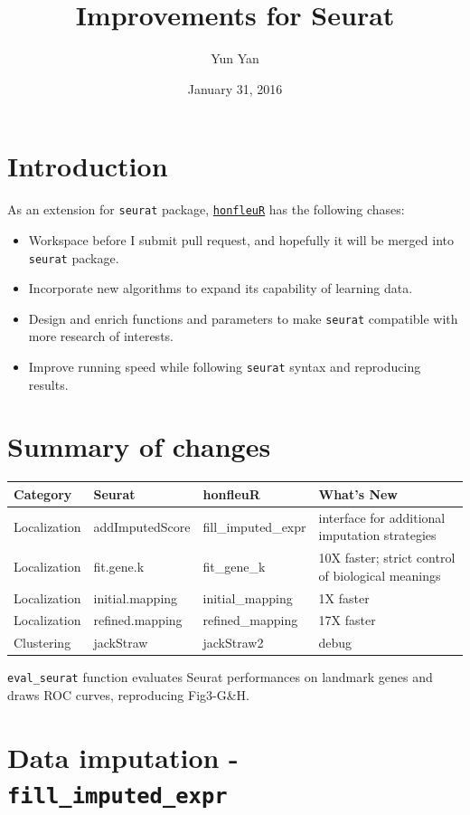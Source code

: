 \documentclass[]{article}
\title{Improvements for Seurat}
\author{Yun Yan}
\date{January 31, 2016}
\providecommand{\tightlist}{%
  \setlength{\itemsep}{0pt}\setlength{\parskip}{0pt}}
\begin{document}
\maketitle

\section{Introduction}\label{introduction}

As an extension for \texttt{seurat} package, \href{https://github.com/Puriney/honfleuR}{\texttt{honfleuR}} has the
following chases:

\begin{itemize}
\tightlist
\item
  Workspace before I submit pull request, and hopefully it will be merged into \texttt{seurat} package.
\item
  Incorporate new algorithms to expand its capability of learning data.
\item
  Design and enrich functions and parameters to make \texttt{seurat}
  compatible with more research of interests.
\item
  Improve running speed while following \texttt{seurat} syntax and
  reproducing results.
\end{itemize}

\section{Summary of changes}\label{summary-of-changes}

\begin{longtable}[c]{llll}
\toprule
Category & Seurat & honfleuR & What's New\tabularnewline
\midrule
\endhead
Localization & addImputedScore & fill\_imputed\_expr & interface for
additional imputation strategies\tabularnewline
Localization & fit.gene.k & fit\_gene\_k & 10X faster; strict control of
biological meanings\tabularnewline
Localization & initial.mapping & initial\_mapping & 1X
faster\tabularnewline
Localization & refined.mapping & refined\_mapping & 17X
faster\tabularnewline
Clustering & jackStraw & jackStraw2 & debug\tabularnewline
\bottomrule
\end{longtable}

\texttt{eval\_seurat} function evaluates Seurat performances on landmark
genes and draws ROC curves, reproducing Fig3-G\&H.

\section{\texorpdfstring{Data imputation -
\texttt{fill\_imputed\_expr}}{Data imputation - fill\_imputed\_expr}}\label{data-imputation---fillux5fimputedux5fexpr}
\end{document}
